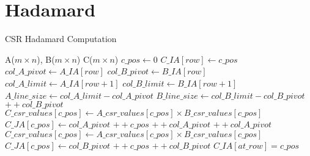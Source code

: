 \documentclass{article}
\begin{document}
\section{Hadamard}
\begin{algorithm}
\caption{CSR Hadamard Computation}\label{hada}
\begin{algorithmic}[1]

\Require A($m\times n$), B($m\times n$)
\Ensure C($m\times n$)
\Statex
\State $c\_pos \gets 0$
    \State $C\_IA[row] \gets c\_pos$
    \State $col\_A\_pivot \gets A\_IA[row]$
    \State $col\_B\_pivot \gets B\_IA[row]$
    \State $col\_A\_limit \gets A\_IA[row+1]$
    \State $col\_B\_limit \gets B\_IA[row+1]$
    \State $A\_line\_size \gets col\_A\_limit - col\_A\_pivot$
    \State $B\_line\_size \gets col\_B\_limit - col\_B\_pivot$
    \Statex
    \State $++col\_B\_pivot$
    \EndFor
               \State $C\_csr\_values[c\_pos] \gets A\_csr\_values[c\_pos] \times B\_csr\_values[c\_pos]$
               \State $C\_JA[c\_pos] \gets col\_A\_pivot$
               \State $++c\_pos$
            \EndIf
            \State $++col\_A\_pivot$
        \EndFor
    \Else
    \State $++col\_A\_pivot$
    \EndFor
               \State $C\_csr\_values[c\_pos] \gets A\_csr\_values[c\_pos] \times B\_csr\_values[c\_pos]$
               \State $C\_JA[c\_pos] \gets col\_B\_pivot$
               \State $++c\_pos$
            \EndIf
            \State $++col\_B\_pivot$
        \EndFor
    \EndIf
\EndFor
    \Statex
\State $C\_IA[at\_row]=c\_pos$
\end{algorithmic}
\end{algorithm}

\newpage
\end{document}
